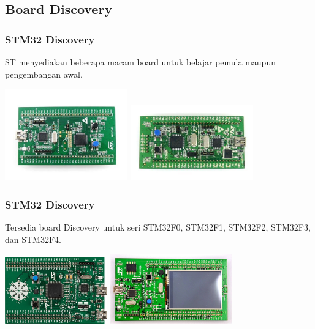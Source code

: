 \documentclass[table,dvipsnames]{beamer}
\begin{document}
	\subsection{Board Discovery}
	\begin{frame}
		\frametitle{STM32 Discovery}
		\begin{exampleblock}{}
			ST menyediakan beberapa macam board untuk belajar pemula maupun pengembangan awal.
		\end{exampleblock}

		\begin{center}
			\includegraphics[width=150pt]{images/f0disco}
			\includegraphics[width=150pt]{images/f1disco}
		\end{center}
	\end{frame}

	\begin{frame}
		\frametitle{STM32 Discovery}

		\begin{exampleblock}{}
			Tersedia board Discovery untuk seri STM32F0, STM32F1, STM32F2, STM32F3, dan STM32F4.
		\end{exampleblock}

		\begin{center}
			\includegraphics[width=125pt]{images/f3disco}
			\includegraphics[width=150pt]{images/f4disco}
		\end{center}
	\end{frame}
\end{document}
